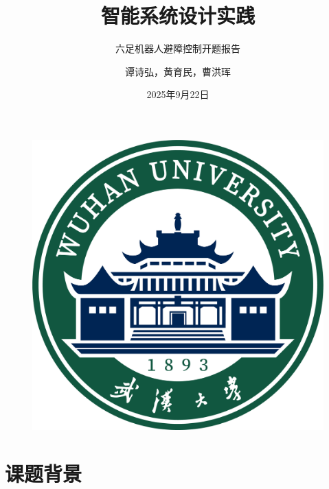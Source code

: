 \documentclass{beamer}
\author{谭诗弘，黄育民，曹洪珲}
\title{智能系统设计实践}
\subtitle{六足机器人避障控制开题报告}
\institute{武汉大学电子信息学院}
\date{2025年9月22日}
\begin{document}
\kaishu
\begin{frame}
    \titlepage
    \begin{figure}[htpb]
        \begin{center}
            \includegraphics[width=0.2\linewidth]{pic/whulogo.png}
        \end{center}
    \end{figure}
\end{frame}

\begin{frame}
    \tableofcontents[sectionstyle=show,subsectionstyle=show/shaded/hide,subsubsectionstyle=show/shaded/hide]
\end{frame}


\section{课题背景}

\end{document}
